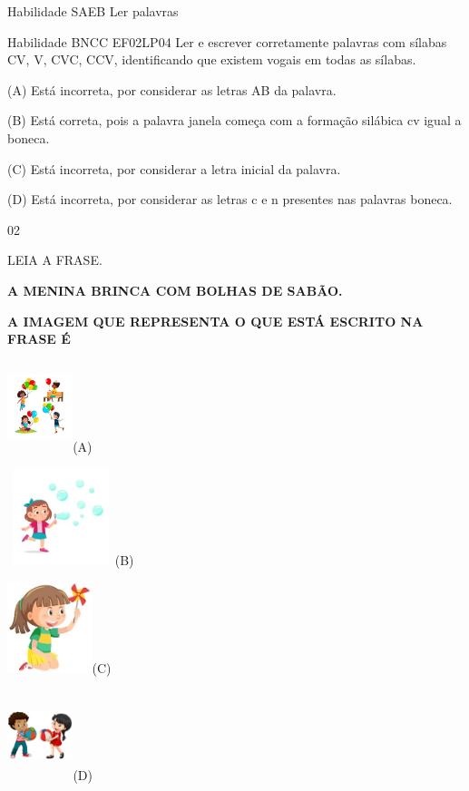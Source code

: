 {{\protect\hypertarget{_Hlk128577378}{}{\protect\hypertarget{_Hlk128665495}{}{}}Habilidade
SAEB Ler palavras

Habilidade BNCC EF02LP04 Ler e escrever corretamente palavras com
sílabas CV, V, CVC, CCV, identificando que existem vogais em todas as
sílabas.

(A) Está incorreta, por considerar as letras AB da palavra.

(B) Está correta, pois a palavra janela começa com a formação silábica
cv igual a boneca.

(C) Está incorreta, por considerar a letra inicial da palavra.

(D) Está incorreta, por considerar as letras c e n presentes nas
palavras boneca.

\num{02}

LEIA A FRASE.

\textbf{A MENINA BRINCA COM BOLHAS DE SABÃO.}

\textbf{A IMAGEM QUE REPRESENTA O QUE ESTÁ ESCRITO NA FRASE É}

\includegraphics[width=0.75159in,height=1.04531in]{media/image78.jpeg}(A)

\includegraphics[width=1.23681in,height=1.10139in]{media/image79.jpeg}(B)

\includegraphics[width=0.97361in,height=1.05069in]{media/image80.jpeg}(C)

\includegraphics[width=0.75437in,height=1.04404in]{media/image81.jpeg}(D)

}}
